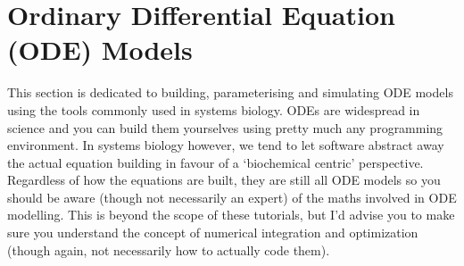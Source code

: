 \documentclass[../main]{subfiles}
\begin{document}
    \section{Ordinary Differential Equation (ODE) Models}
    This section is dedicated to building, parameterising and simulating ODE models using the tools
    commonly used in systems biology. ODEs are widespread in science and you can build them yourselves
    using pretty much any programming environment. In systems biology however, we tend to let
    software abstract away the actual equation building in favour of a `biochemical centric' perspective. Regardless
    of how the equations are built, they are still all ODE models so you should be aware (though not necessarily an
    expert) of the maths involved in ODE modelling. This is beyond the scope of these tutorials, but I'd advise you
    to make sure you understand the concept of numerical integration and optimization (though again, not necessarily how
    to actually code them).

    
    
\end{document}
